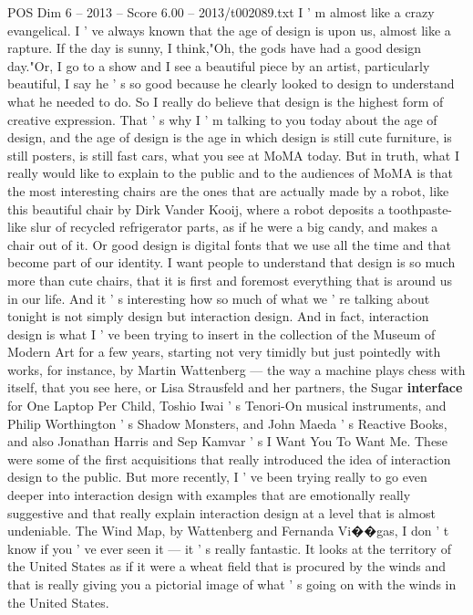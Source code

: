\begin{textsample}{POS Dim 6 – 2013 – Score 6.00 – 2013/t002089.txt}  \label{ex:f6_pos_036}
I ' m almost like a crazy evangelical.
I ' ve always known that the age of design is upon us, almost like a rapture.
If the day is sunny, I think,"Oh, the gods have had a good design day."Or, I go to a show and I see a beautiful piece by an artist, particularly beautiful, I say he ' s so good because he clearly looked to design to understand what he needed to do.
So I really do believe that design is the highest form of creative expression.
That ' s why I ' m talking to you today about the age of design, and the age of design is the age in which design is still cute furniture, is still posters, is still fast cars, what you see at MoMA today.
But in truth, what I really would like to explain to the public and to the audiences of MoMA is that the most interesting chairs are the ones that are actually made by a robot, like this beautiful chair by Dirk Vander Kooij, where a robot deposits a toothpaste-like slur of recycled refrigerator parts, as if he were a big candy, and makes a chair out of it.
Or good design is digital fonts that we use all the time and that become part of our identity.
I want people to understand that design is so much more than cute chairs, that it is first and foremost everything that is around us in our life.
And it ' s interesting how so much of what we ' re talking about tonight is not simply design but interaction design.
And in fact, interaction design is what I ' ve been trying to insert in the collection of the Museum of Modern Art for a few years, starting not very timidly but just pointedly with works, for instance, by Martin Wattenberg — the way a machine plays chess with itself, that you see here, or Lisa Strausfeld and her partners, the Sugar \textbf{interface} for One Laptop Per Child, Toshio Iwai ' s Tenori-On musical instruments, and Philip Worthington ' s Shadow Monsters, and John Maeda ' s Reactive Books, and also Jonathan Harris and Sep Kamvar ' s I Want You To Want Me.
These were some of the first acquisitions that really introduced the idea of interaction design to the public.
But more recently, I ' ve been trying really to go even deeper into interaction design with examples that are emotionally really suggestive and that really explain interaction design at a level that is almost undeniable.
The Wind Map, by Wattenberg and Fernanda Vi{\EmojiFont �}{\EmojiFont �}gas, I don ' t know if you ' ve ever seen it — it ' s really fantastic.
It looks at the territory of the United States as if it were a wheat field that is procured by the winds and that is really giving you a pictorial image of what ' s going on with the winds in the United States.

\end{textsample}
